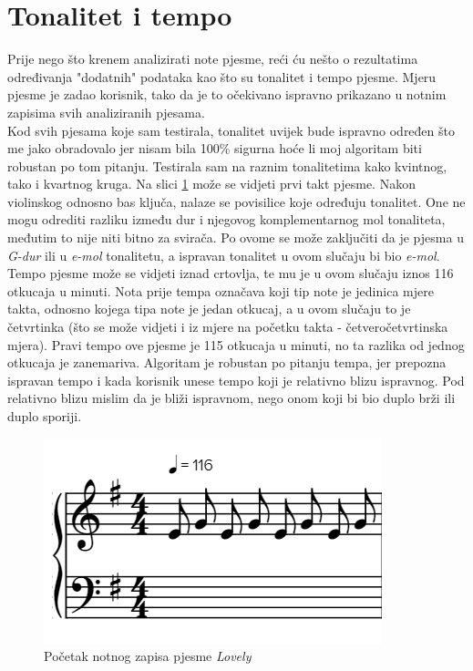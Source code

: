\documentclass[times, utf8, zavrsni, numeric]{fer}
\begin{document}
\section{Tonalitet i tempo}
Prije nego što krenem analizirati note pjesme, reći ću nešto o rezultatima određivanja "dodatnih" podataka kao što su tonalitet i tempo pjesme. Mjeru pjesme je zadao korisnik, tako da je to očekivano ispravno prikazano u notnim zapisima svih analiziranih pjesama.\\

Kod svih pjesama koje sam testirala, tonalitet uvijek bude ispravno određen što me jako obradovalo jer nisam bila 100\% sigurna hoće li moj algoritam biti robustan po tom pitanju. Testirala sam na raznim tonalitetima kako kvintnog, tako i kvartnog kruga. Na slici \ref{fig:lovelybeg} može se vidjeti prvi takt pjesme. Nakon violinskog odnosno bas ključa, nalaze se povisilice koje određuju tonalitet. One ne mogu odrediti razliku između dur i njegovog komplementarnog mol tonaliteta, međutim to nije niti bitno za svirača. Po ovome se može zaključiti da je pjesma u \textit{G-dur} ili u \textit{e-mol} tonalitetu, a ispravan tonalitet u ovom slučaju bi bio \textit{e-mol}.\\

Tempo pjesme može se vidjeti iznad crtovlja, te mu je u ovom slučaju iznos 116 otkucaja u minuti. Nota prije tempa označava koji tip note je jedinica mjere takta, odnosno kojega tipa note je jedan otkucaj, a u ovom slučaju to je četvrtinka (što se može vidjeti i iz mjere na početku takta - četveročetvrtinska mjera). Pravi tempo ove pjesme je 115 otkucaja u minuti, no ta razlika od jednog otkucaja je zanemariva. Algoritam je robustan po pitanju tempa, jer prepozna ispravan tempo i kada korisnik unese tempo koji je relativno blizu ispravnog. Pod relativno blizu mislim da je bliži ispravnom, nego onom koji bi bio duplo brži ili duplo sporiji.

\begin{figure}[h]
	\includegraphics[scale=1]{lovelybeg.png}
	\centering
	\caption{Početak notnog zapisa pjesme \textit{Lovely}}
	\label{fig:lovelybeg}
\end{figure}
\end{document}
